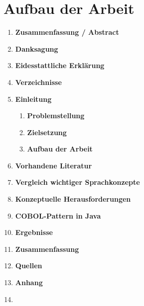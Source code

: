 \chapter{Aufbau der Arbeit}

\begin{framed}
\begin{enumerate}[label=\arabic*.]
    \item[] \textbf{Zusammenfassung / Abstract}

    \item[] \textbf{Danksagung}

    \item[] \textbf{Eidesstattliche Erklärung}

    \item[] \textbf{Verzeichnisse}

    \item   \textbf{Einleitung}      
        \begin{enumerate}[label=\arabic*.]
            \item \textbf{Problemstellung}
            \item \textbf{Zielsetzung}
            \item \textbf{Aufbau der Arbeit}
        \end{enumerate}

    \item   \textbf{Vorhandene Literatur}
    
    \item   \textbf{Vergleich wichtiger Sprachkonzepte}
    
    \item   \textbf{Konzeptuelle Herausforderungen}

    \item   \textbf{COBOL-Pattern in Java}
    
    \item   \textbf{Ergebnisse}
    
    \item   \textbf{Zusammenfassung}
    
    \item[] \textbf{Quellen}
    
    \item[] \textbf{Anhang}
    
    \item[]
\end{enumerate}
\end{framed}